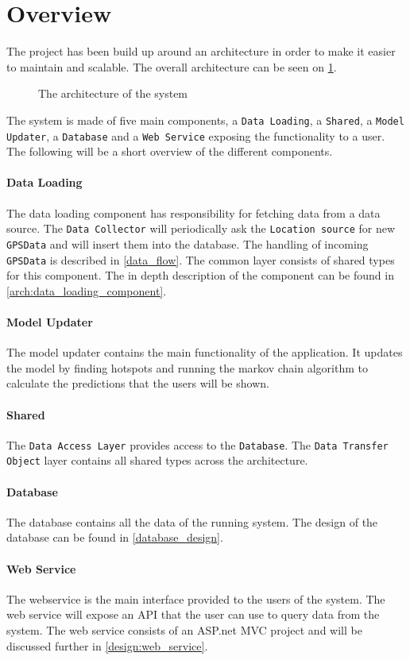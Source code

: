 \section{Overview}
The project has been build up around an architecture in order to make it easier to maintain and scalable.
The overall architecture can be seen on \cref{arch}.

\begin{figure}[h]
\center

\caption{The architecture of the system}
\label{arch}
\end{figure}

The system is made of five main components, a \texttt{Data Loading}, a \texttt{Shared}, a \texttt{Model Updater}, a \texttt{Database} and a \texttt{Web Service} exposing the functionality to a user.
The following will be a short overview of the different components.

\paragraph{Data Loading}
The data loading component has responsibility for fetching data from a data source.
The \texttt{Data Collector} will periodically ask the \texttt{Location source} for new \texttt{GPSData} and will insert them into the database. 
The handling of incoming \texttt{GPSData} is described in  \cref{data_flow}.
The common layer consists of shared types for this component.
The in depth description of the component can be found in \cref{arch:data_loading_component}.

\paragraph{Model Updater}
The model updater contains the main functionality of the application.
It updates the model by finding hotspots and running the markov chain algorithm to calculate the predictions that the users will be shown.

\paragraph{Shared}
The \texttt{Data Access Layer} provides access to the \texttt{Database}.
The \texttt{Data Transfer Object} layer contains all shared types across the architecture.

\paragraph{Database}
The database contains all the data of the running system.
The design of the database can be found in \cref{database_design}.

\paragraph{Web Service}
The webservice is the main interface provided to the users of the system.
The web service will expose an API that the user can use to query data from the system.
The web service consists of an ASP.net MVC project and will be discussed further in \cref{design:web_service}.





